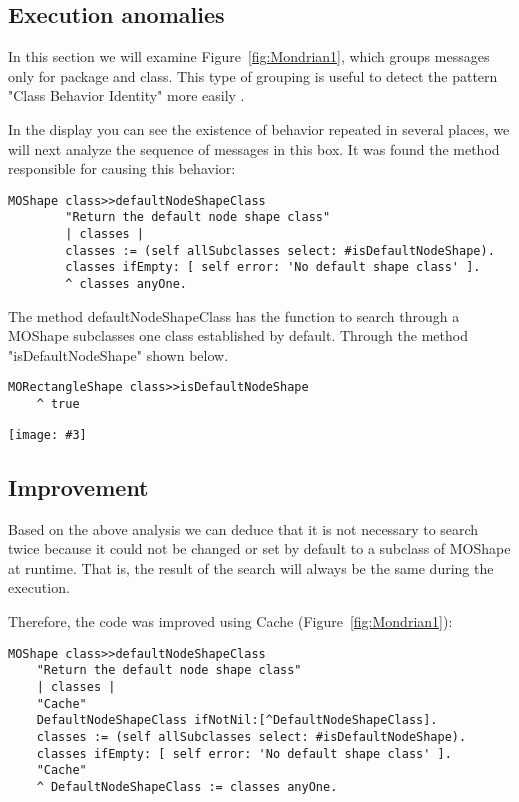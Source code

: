 \documentclass{sig-alternate}
\newcommand{\largefig}[4]{
	\begin{figure*}[#1]
		\centering
		\texttt{[image: \#3]}
		\caption{\label{fig:#3}#4}
	\end{figure*}}
\newcommand{\figref}[1]{Figure~\ref{fig:#1}}
\begin{document}
\subsection{Execution anomalies}

In this section we will examine \figref{Mondrian1}, which groups messages only for package and class. This type of grouping is useful to detect the pattern "Class Behavior Identity" more easily .

In the display you can see the existence of behavior repeated in several places, we  will next analyze the sequence of messages in this box. It was found the method responsible for causing this behavior:

\begin{lstlisting}[language=Smalltalk]
MOShape class>>defaultNodeShapeClass
		"Return the default node shape class"
		| classes |
		classes := (self allSubclasses select: #isDefaultNodeShape).
		classes ifEmpty: [ self error: 'No default shape class' ].
		^ classes anyOne.
\end{lstlisting} 

The method defaultNodeShapeClass has the function to search through a MOShape subclasses one class established by default. Through the method "isDefaultNodeShape" shown below.

\begin{lstlisting}[language=Smalltalk]
MORectangleShape class>>isDefaultNodeShape
	^ true
\end{lstlisting} 

\largefig{}{1.0}{Mondrian1}{Before Improvement}
\subsection{Improvement}

Based on the above analysis we can deduce that it is not necessary to search twice because it could not be changed or set by default to a subclass of MOShape at runtime. That is, the result of the search will always be the same during the execution.

Therefore, the code was improved using Cache (\figref{Mondrian1}):

\begin{lstlisting}[language=Smalltalk]
MOShape class>>defaultNodeShapeClass
	"Return the default node shape class"
	| classes |
	"Cache"
	DefaultNodeShapeClass ifNotNil:[^DefaultNodeShapeClass].
	classes := (self allSubclasses select: #isDefaultNodeShape).
	classes ifEmpty: [ self error: 'No default shape class' ].
	"Cache"
	^ DefaultNodeShapeClass := classes anyOne.
\end{lstlisting} 
\end{document}
